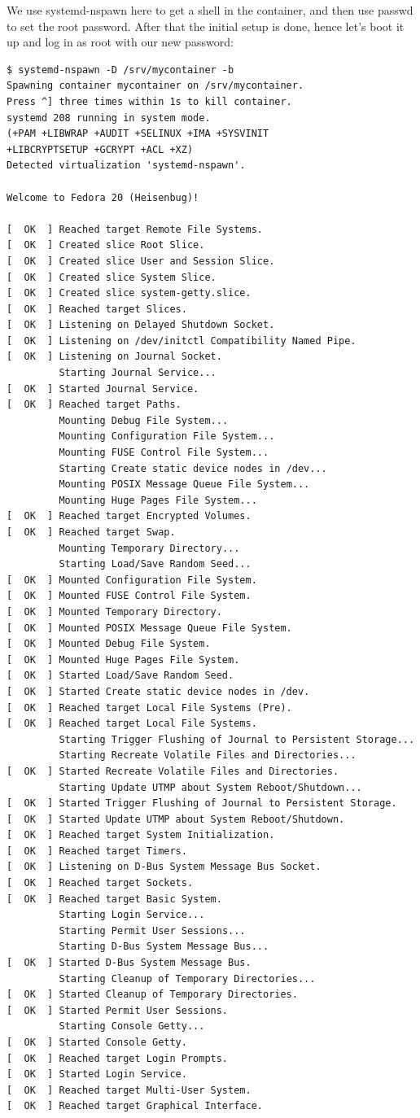 \documentclass[titlepage]{article}
\begin{document}
We use systemd-nspawn here to get a shell in the container, and then use passwd to set the root password. After that the initial setup is done, hence let's boot it up and log in as root with our new password:
\begin{lstlisting}
$ systemd-nspawn -D /srv/mycontainer -b
Spawning container mycontainer on /srv/mycontainer.
Press ^] three times within 1s to kill container.
systemd 208 running in system mode. 
(+PAM +LIBWRAP +AUDIT +SELINUX +IMA +SYSVINIT 
+LIBCRYPTSETUP +GCRYPT +ACL +XZ)
Detected virtualization 'systemd-nspawn'.

Welcome to Fedora 20 (Heisenbug)!

[  OK  ] Reached target Remote File Systems.
[  OK  ] Created slice Root Slice.
[  OK  ] Created slice User and Session Slice.
[  OK  ] Created slice System Slice.
[  OK  ] Created slice system-getty.slice.
[  OK  ] Reached target Slices.
[  OK  ] Listening on Delayed Shutdown Socket.
[  OK  ] Listening on /dev/initctl Compatibility Named Pipe.
[  OK  ] Listening on Journal Socket.
         Starting Journal Service...
[  OK  ] Started Journal Service.
[  OK  ] Reached target Paths.
         Mounting Debug File System...
         Mounting Configuration File System...
         Mounting FUSE Control File System...
         Starting Create static device nodes in /dev...
         Mounting POSIX Message Queue File System...
         Mounting Huge Pages File System...
[  OK  ] Reached target Encrypted Volumes.
[  OK  ] Reached target Swap.
         Mounting Temporary Directory...
         Starting Load/Save Random Seed...
[  OK  ] Mounted Configuration File System.
[  OK  ] Mounted FUSE Control File System.
[  OK  ] Mounted Temporary Directory.
[  OK  ] Mounted POSIX Message Queue File System.
[  OK  ] Mounted Debug File System.
[  OK  ] Mounted Huge Pages File System.
[  OK  ] Started Load/Save Random Seed.
[  OK  ] Started Create static device nodes in /dev.
[  OK  ] Reached target Local File Systems (Pre).
[  OK  ] Reached target Local File Systems.
         Starting Trigger Flushing of Journal to Persistent Storage...
         Starting Recreate Volatile Files and Directories...
[  OK  ] Started Recreate Volatile Files and Directories.
         Starting Update UTMP about System Reboot/Shutdown...
[  OK  ] Started Trigger Flushing of Journal to Persistent Storage.
[  OK  ] Started Update UTMP about System Reboot/Shutdown.
[  OK  ] Reached target System Initialization.
[  OK  ] Reached target Timers.
[  OK  ] Listening on D-Bus System Message Bus Socket.
[  OK  ] Reached target Sockets.
[  OK  ] Reached target Basic System.
         Starting Login Service...
         Starting Permit User Sessions...
         Starting D-Bus System Message Bus...
[  OK  ] Started D-Bus System Message Bus.
         Starting Cleanup of Temporary Directories...
[  OK  ] Started Cleanup of Temporary Directories.
[  OK  ] Started Permit User Sessions.
         Starting Console Getty...
[  OK  ] Started Console Getty.
[  OK  ] Reached target Login Prompts.
[  OK  ] Started Login Service.
[  OK  ] Reached target Multi-User System.
[  OK  ] Reached target Graphical Interface.


\end{lstlisting}
\end{document}
